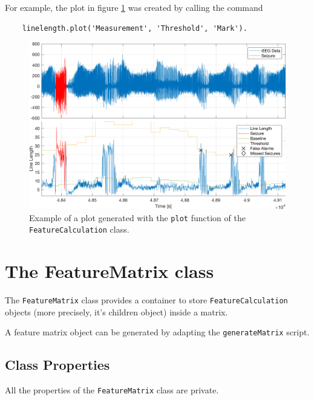 \documentclass[usletter, 11pt]{extarticle}
\begin{document}
For example, the plot in figure \ref{fig:plot_feature} was created by calling the command
\begin{Verbatim}
	linelength.plot('Measurement', 'Threshold', 'Mark').
\end{Verbatim}

\begin{figure}[!h]
	\centering
	\includegraphics[width = \textwidth]{img/example_feature_plot}
	\caption{Example of a plot generated with the \texttt{plot} function of the \texttt{FeatureCalculation} class.}
	\label{fig:plot_feature}
\end{figure}

\clearpage
\section{The FeatureMatrix class}

The \verb|FeatureMatrix| class provides a container to store \verb|FeatureCalculation| objects (more precisely, it's children object) inside a matrix.

A feature matrix object can be generated by adapting the \verb|generateMatrix| script.

\subsection{Class Properties}

All the properties of the \verb|FeatureMatrix| class are private.
\end{document}
